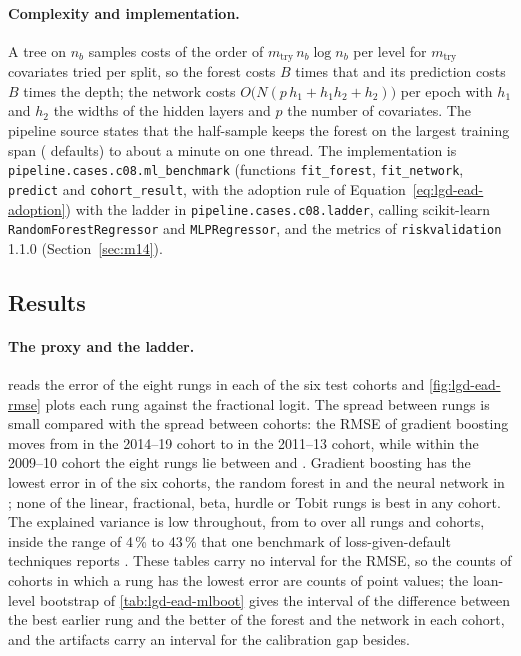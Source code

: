 \paragraph{Complexity and implementation.} A tree on $n_b$ samples costs of the order of $m_{\mathrm{try}}\,n_b\log n_b$ per level for $m_{\mathrm{try}}$ covariates tried per split, so the forest costs $B$ times that and its prediction costs $B$ times the depth; the network costs $O\bigl(N(p\,h_1+h_1h_2+h_2)\bigr)$ per epoch with $h_1$ and $h_2$ the widths of the hidden layers and $p$ the number of covariates. The pipeline source states that the half-sample keeps the forest on the largest training span ( defaults) to about a minute on one thread. The implementation is \texttt{pipeline.cases.c08.ml\_benchmark} (functions \texttt{fit\_forest}, \texttt{fit\_network}, \texttt{predict} and \texttt{cohort\_result}, with the adoption rule of Equation~\eqref{eq:lgd-ead-adoption}) with the ladder in \texttt{pipeline.cases.c08.ladder}, calling scikit-learn \texttt{RandomForestRegressor} and \texttt{MLPRegressor}, and the metrics of \texttt{riskvalidation} 1.1.0 (Section~\ref{sec:m14}).

\subsection{Results}
\label{sec:results-lgd-ead}

\paragraph{The proxy and the ladder.}  reads the error of the eight rungs in each of the six test cohorts and \cref{fig:lgd-ead-rmse} plots each rung against the fractional logit. The spread between rungs is small compared with the spread between cohorts: the RMSE of gradient boosting moves from  in the 2014--19 cohort to  in the 2011--13 cohort, while within the 2009--10 cohort the eight rungs lie between  and . Gradient boosting has the lowest error in  of the six cohorts, the random forest in  and the neural network in ; none of the linear, fractional, beta, hurdle or Tobit rungs is best in any cohort. The explained variance is low throughout, from  to  over all rungs and cohorts, inside the range of 4\,\% to 43\,\% that one benchmark of loss-given-default techniques reports \citep{lgd-ead:loterman2012}. These tables carry no interval for the RMSE, so the counts of cohorts in which a rung has the lowest error are counts of point values; the loan-level bootstrap of \cref{tab:lgd-ead-mlboot} gives the interval of the difference between the best earlier rung and the better of the forest and the network in each cohort, and the artifacts carry an interval for the calibration gap besides.

